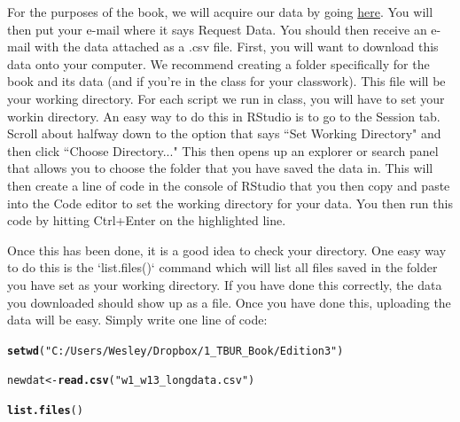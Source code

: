\documentclass[11pt,openany]{book}\usepackage[]{graphicx}\usepackage[]{color}
\makeatletter
\newcommand{\hlstr}[1]{\textcolor[rgb]{0.192,0.494,0.8}{#1}}%
\newcommand{\hlstd}[1]{\textcolor[rgb]{0.345,0.345,0.345}{#1}}%
\newcommand{\hlkwb}[1]{\textcolor[rgb]{0.69,0.353,0.396}{#1}}%
\newcommand{\hlkwd}[1]{\textcolor[rgb]{0.737,0.353,0.396}{\textbf{#1}}}%
\newenvironment{kframe}{%
 \def\at@end@of@kframe{}%
 \ifinner\ifhmode%
  \def\at@end@of@kframe{\end{minipage}}%
  \begin{minipage}{\columnwidth}%
 \fi\fi%
 \def\FrameCommand##1{\hskip\@totalleftmargin \hskip-\fboxsep
 \colorbox{shadecolor}{##1}\hskip-\fboxsep
     \hskip-\linewidth \hskip-\@totalleftmargin \hskip\columnwidth}%
 \MakeFramed {\advance\hsize-\width
   \@totalleftmargin\z@ \linewidth\hsize
   \@setminipage}}%
 {\par\unskip\endMakeFramed%
 \at@end@of@kframe}
\newenvironment{knitrout}{}{} %
\renewenvironment{knitrout}{\begin{singlespace}}{\end{singlespace}} %
\makeatother
\begin{document}
For the purposes of the book, we will acquire our data by going \href{http://crcm.ou.edu/epscordata/}{here}. You will then put your e-mail where it says Request Data. You should then receive an e-mail with the data attached as a .csv file. First, you will want to download this data onto your computer. We recommend creating a folder specifically for the book and its data (and if you're in the class for your classwork). This file will be your working directory. For each script we run in class, you will have to set your workin directory. An easy way to do this in RStudio is to go to the Session tab. Scroll about halfway down to the option that says ``Set Working Directory" and then click ``Choose Directory..." This then opens up an explorer or search panel that allows you to choose the folder that you have saved the data in. This will then create a line of code in the console of RStudio that you then copy and paste into the Code editor to set the working directory for your data. You then run this code by hitting Ctrl+Enter on the highlighted line. 

Once this has been done, it is a good idea to check your directory. One easy way to do this is the `list.files()` command which will list all files saved in the folder you have set as your working directory. If you have done this correctly, the data you downloaded should show up as a file. Once you have done this, uploading the data will be easy. Simply write one line of code:

\begin{knitrout}
\color{fgcolor}\begin{kframe}
\begin{alltt}
\hlkwd{setwd}\hlstd{(}\hlstr{"C:/Users/Wesley/Dropbox/1_TBUR_Book/Edition3"}\hlstd{)}

\hlstd{newdat} \hlkwb{<-} \hlkwd{read.csv}\hlstd{(}\hlstr{"w1_w13_longdata.csv"}\hlstd{)}
\end{alltt}
\end{kframe}
\end{knitrout}

\begin{knitrout}
\color{fgcolor}\begin{kframe}
\begin{alltt}
\hlkwd{list.files}\hlstd{()}
\end{alltt}
\end{kframe}
\end{knitrout}
\end{document}
